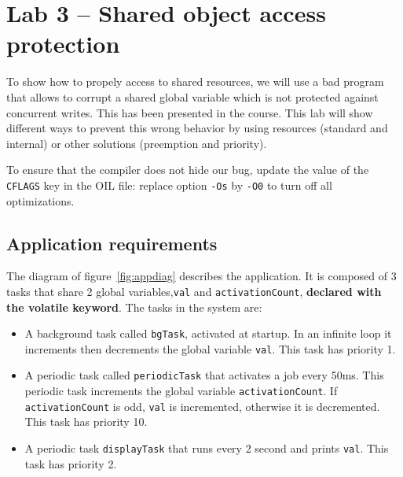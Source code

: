 \documentclass[11pt]{report}
\begin{document}
\chapter{Lab 3 -- Shared object access protection}

To show how to propely access to shared resources, we will use a bad program that allows to corrupt a shared global variable which is not protected against concurrent writes. This has been presented in the course. This lab will show different ways to prevent this wrong behavior by using resources (standard and internal) or other solutions (preemption and priority).

To ensure that the compiler does not hide our bug, update the value of the \texttt{CFLAGS} key in the OIL file: replace option \texttt{-Os} by \texttt{-O0} to turn off all optimizations.

\section{Application requirements}

The diagram of figure~\ref{fig:appdiag} describes the application.
It is composed of 3 tasks that share 2 global variables,\texttt{val} and \texttt{activationCount}, {\bf declared with the volatile keyword}.
The tasks in the system are:
\begin{itemize}
\item A background task called \texttt{bgTask}, activated at startup. In an infinite loop it increments then decrements the global variable \texttt{val}. This task has priority 1.
\item A periodic task called \texttt{periodicTask} that activates a job every 50ms. This periodic task increments the global variable \texttt{activationCount}. If \texttt{activationCount} is odd, \texttt{val} is incremented, otherwise it is decremented. This task has priority 10.
\item A periodic task \texttt{displayTask} that runs every 2 second and prints \texttt{val}. This task has priority 2.
\end{itemize}

\def\alarm#1#2{
  \node[alarm](#1) [#2] {};
  \coordinate (a) at ($(#1.north)$);
  \coordinate (b) at ($(#1.north east)$);
  \coordinate (c) at ($(#1.north west)$);
  \coordinate (d) at ($(#1)$);
  \draw[thick] ($(a)+(-0.1,0)$) rectangle ($(a)+(0.1,0.1)$);
  \draw[rotate=-45,thick] ($(b)+(-0.05,0)$) rectangle ($(b)+(0.05,0.1)$);
  \draw[rotate=45,thick] ($(c)+(-0.05,0)$) rectangle ($(c)+(0.05,0.1)$);
  \draw ($(d)+(0.3,0)$) -- (d) -- ($(d)+(0,0.3)$);
  \node [font=\scriptsize,below=0.5mm of #1] {{\em Alarm}}
}
\end{document}
